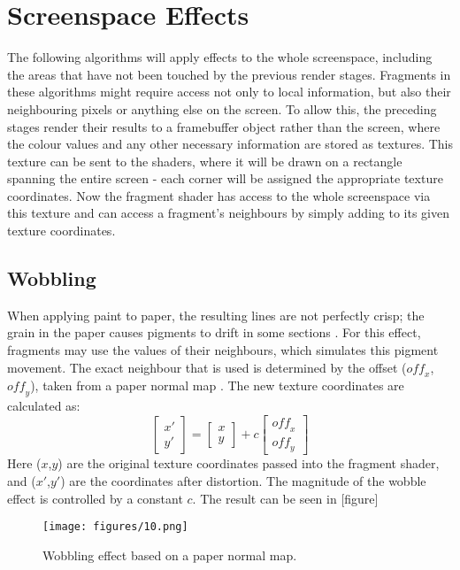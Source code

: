 \documentclass[a4paper, 12pt]{article}
\begin{document}

\section{Screenspace Effects}
The following algorithms will apply effects to the whole screenspace, including the areas that have not been touched by the previous render stages. Fragments in these algorithms might require access not only to local information, but also their neighbouring pixels or anything else on the screen. To allow this, the preceding stages render their results to a framebuffer object rather than the screen, where the colour values and any other necessary information are stored as textures. This texture can be sent to the shaders, where it will be drawn on a rectangle spanning the entire screen - each corner will be assigned the appropriate texture coordinates. Now the fragment shader has access to the whole screenspace via this texture and can access a fragment's neighbours by simply adding to its given texture coordinates.


\subsection{Wobbling}
When applying paint to paper, the resulting lines are not perfectly crisp; the grain in the paper causes pigments to drift in some sections \cite{Curtis1997}. For this effect, fragments may use the values of their neighbours, which simulates this pigment movement. The exact neighbour that is used is determined by the offset ($\mathit{off}_x$, $\mathit{off}_y$), taken from a paper normal map \cite{Nienhaus2005}. The new texture coordinates are calculated as:
$$\begin{bmatrix}x'\\y'\end{bmatrix} = \begin{bmatrix}x\\y\end{bmatrix} + c\begin{bmatrix}\mathit{off}_x\\\mathit{off}_y\end{bmatrix}$$
Here ($x$,$y$) are the original texture coordinates passed into the fragment shader, and ($x'$,$y'$) are the coordinates after distortion. The magnitude of the wobble effect is controlled by a constant $c$. The result can be seen in [figure]

\begin{figure}
  \centering
  \texttt{[image: figures/10.png]}
  \caption{Wobbling effect based on a paper normal map.}
\end{figure}
\end{document}
